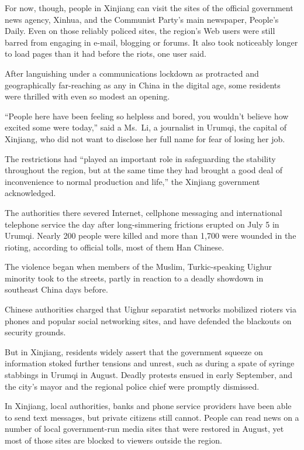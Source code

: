 ﻿\documentclass[12pt]{article}
\begin{document}
For now, though, people in Xinjiang can visit the sites of the official government news agency,
Xinhua, and the Communist Party's main newspaper, People's Daily. Even on those reliably policed
sites, the region's Web users were still barred from engaging in e-mail, blogging or forums. It also
took noticeably longer to load pages than it had before the riots, one user said.

After languishing under a communications lockdown as protracted and geographically far-reaching as
any in China in the digital age, some residents were thrilled with even so modest an opening.

``People here have been feeling so helpless and bored, you wouldn't believe how excited some were
today,'' said a Ms.~Li, a journalist in Urumqi, the capital of Xinjiang, who did not want to
disclose her full name for fear of losing her job.

The restrictions had ``played an important role in safeguarding the stability throughout the region,
but at the same time they had brought a good deal of inconvenience to normal production and life,''
the Xinjiang government acknowledged.

The authorities there severed Internet, cellphone messaging and international telephone service the
day after long-simmering frictions erupted on July 5 in Urumqi. Nearly 200 people were killed and
more than 1,700 were wounded in the rioting, according to official tolls, most of them Han Chinese.

The violence began when members of the Muslim, Turkic-speaking Uighur minority took to the streets,
partly in reaction to a deadly showdown in southeast China days before.

Chinese authorities charged that Uighur separatist networks mobilized rioters via phones and popular
social networking sites, and have defended the blackouts on security grounds.

But in Xinjiang, residents widely assert that the government squeeze on information stoked further
tensions and unrest, such as during a spate of syringe stabbings in Urumqi in August. Deadly
protests ensued in early September, and the city's mayor and the regional police chief were promptly
dismissed.

In Xinjiang, local authorities, banks and phone service providers have been able to send text
messages, but private citizens still cannot. People can read news on a number of local
government-run media sites that were restored in August, yet most of those sites are blocked to
viewers outside the region.
\end{document}
